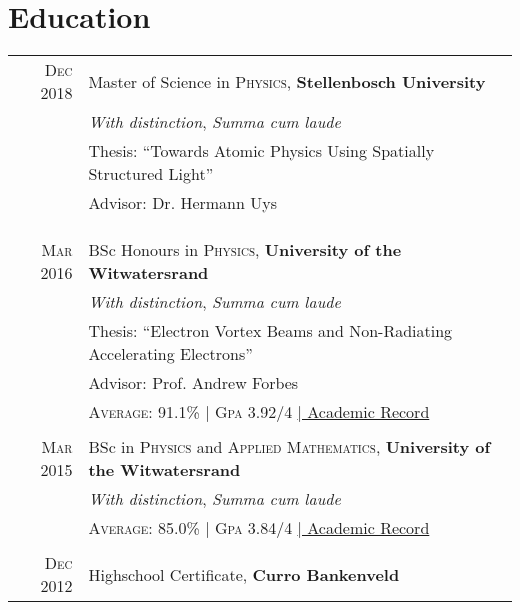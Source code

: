 \section{Education}

\begin{supertabular}{rl}
	\textsc{Dec} 2018 & Master of Science in \textsc{Physics}, \textbf{Stellenbosch University}                                                 \\
					  & \small\emph{With distinction}, \emph{Summa cum laude} \\
					  & Thesis: ``Towards Atomic Physics Using Spatially Structured Light''                                                     \\
	                  & \small Advisor: Dr. Hermann Uys                                                                                       \\
	                  &                                                                                                                         \\
	                  & \\ %
	                  & \\ %
	\textsc{Mar} 2016 & BSc Honours in  \textsc{Physics}, \textbf{University of the Witwatersrand}                                              \\
	                  & \small\emph{With distinction}, \emph{Summa cum laude}                                                                  \\
	                  & Thesis: ``Electron Vortex Beams and Non-Radiating Accelerating Electrons''                                            \\
	                  & \small Advisor: Prof. Andrew Forbes                                                                                     \\
	                  & \normalsize \textsc{Average}: 91.1\% | \textsc{Gpa} 3.92/4 \hyperlink{honours}{\hfill| \footnotesize Academic Record}  \\
	                  &                                                                                                                         \\
	\textsc{Mar} 2015 & BSc in \textsc{Physics} and \textsc{Applied Mathematics}, \textbf{University of the Witwatersrand}                      \\
	                  & \small\emph{With distinction}, \emph{Summa cum laude}                                                                  \\
	                  & \normalsize \textsc{Average}: 85.0\% | \textsc{Gpa} 3.84/4 \hyperlink{undergrad}{\hfill| \footnotesize Academic Record} \\
	                  &                                                                                                                         \\
	\textsc{Dec} 2012 & Highschool Certificate, \textbf{Curro Bankenveld} \\
\end{supertabular}